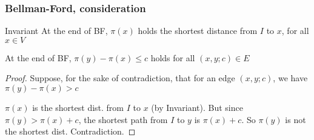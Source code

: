 \begin{frame}
\begin{columns}
  \begin{column}{.55\textwidth}
    \begin{center}
    \begin{overlayarea}{.55\textwidth}{3cm}
      \only<1|handout:0>{}
      \only<2|handout:0>{}
    \end{overlayarea}
    \end{center}
  \end{column}

  \end{columns}

\end{frame}

\begin{frame}
  \frametitle{Bellman-Ford, consideration}

  \scriptsize

  \begin{exampleblock}{Invariant}
  At the end of BF, $\pi(x)$ holds the shortest distance from $I$ to $x$, for all $x \in V$ \\
  \end{exampleblock}
  \vfill
  \pause
  \begin{lemma}
  At the end of BF, $\pi(y) - \pi(x) \leq c$ holds for all $(x,y;c) \in E$
  \end{lemma}
  \vfill
  \pause
  \begin{proof}
  Suppose, for the sake of contradiction, that for an edge $(x,y;c)$, we have $\pi(y) - \pi(x) > c$
    \begin{center}
      
    \end{center}
    \vspace{-30pt}
    $\pi(x)$ is the shortest dist. from $I$ to $x$ (by Invariant). But since $\pi(y) > \pi(x) + c$, 
    the shortest path from $I$ to $y$ is $\pi(x) + c$. So $\pi(y)$ is not the shortest dist. Contradiction.
  \end{proof}

\end{frame}

